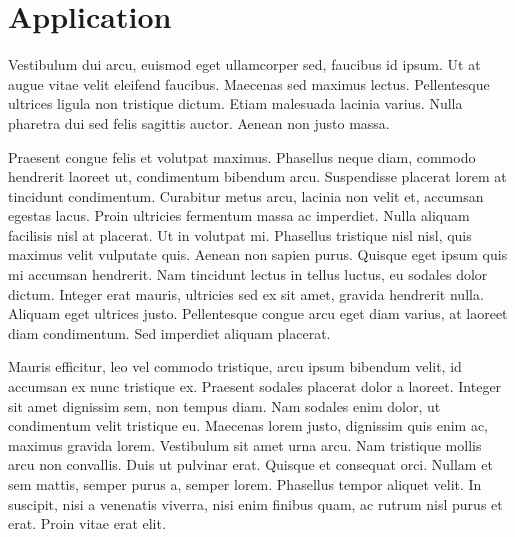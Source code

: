 \documentclass[11pt,twoside,a4paper]{article}
\begin{document}
	\section{Application}
	Vestibulum dui arcu, euismod eget ullamcorper sed, faucibus id ipsum. Ut at augue vitae velit eleifend faucibus. Maecenas sed maximus lectus. Pellentesque ultrices ligula non tristique dictum. Etiam malesuada lacinia varius. Nulla pharetra dui sed felis sagittis auctor. Aenean non justo massa.
	
	Praesent congue felis et volutpat maximus. Phasellus neque diam, commodo hendrerit laoreet ut, condimentum bibendum arcu. Suspendisse placerat lorem at tincidunt condimentum. Curabitur metus arcu, lacinia non velit et, accumsan egestas lacus. Proin ultricies fermentum massa ac imperdiet. Nulla aliquam facilisis nisl at placerat. Ut in volutpat mi. Phasellus tristique nisl nisl, quis maximus velit vulputate quis. Aenean non sapien purus. Quisque eget ipsum quis mi accumsan hendrerit. Nam tincidunt lectus in tellus luctus, eu sodales dolor dictum. Integer erat mauris, ultricies sed ex sit amet, gravida hendrerit nulla. Aliquam eget ultrices justo. Pellentesque congue arcu eget diam varius, at laoreet diam condimentum. Sed imperdiet aliquam placerat.
	
	Mauris efficitur, leo vel commodo tristique, arcu ipsum bibendum velit, id accumsan ex nunc tristique ex. Praesent sodales placerat dolor a laoreet. Integer sit amet dignissim sem, non tempus diam. Nam sodales enim dolor, ut condimentum velit tristique eu. Maecenas lorem justo, dignissim quis enim ac, maximus gravida lorem. Vestibulum sit amet urna arcu. Nam tristique mollis arcu non convallis. Duis ut pulvinar erat. Quisque et consequat orci. Nullam et sem mattis, semper purus a, semper lorem. Phasellus tempor aliquet velit. In suscipit, nisi a venenatis viverra, nisi enim finibus quam, ac rutrum nisl purus et erat. Proin vitae erat elit.
	
\end{document}
